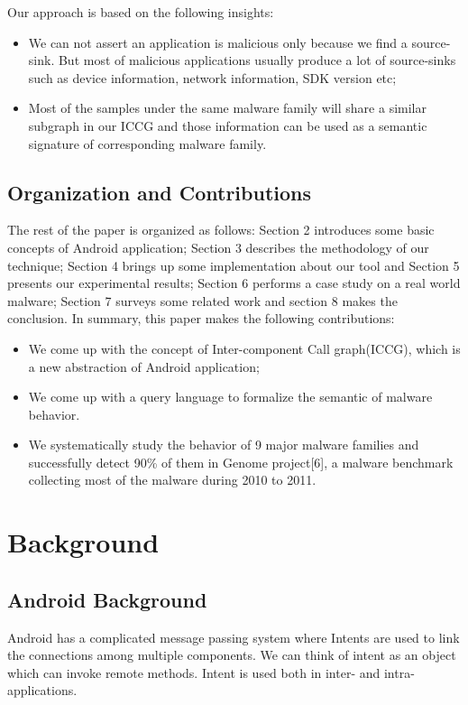 \documentclass{sig-alternate}
\begin{document}
Our approach is based on the following insights:
\begin{itemize}
  \item We can not assert an application is malicious only because we find a source-sink. But most of malicious applications usually produce a lot of source-sinks such as device information, network information, SDK version etc;
    \item Most of the samples under the same malware family will share a similar subgraph in our ICCG and those information can be used as a semantic signature of corresponding malware family.
\end{itemize}

\subsection{Organization and Contributions}
The rest of the paper is organized as follows: Section 2 introduces some basic concepts of Android application; Section 3 describes the methodology of our technique; Section 4 brings up some implementation about our tool and Section 5 presents our experimental results; Section 6 performs a case study on a real world malware; Section 7 surveys some related work and section 8 makes the conclusion. In summary, this paper makes the following contributions:
\begin{itemize}
  \item We come up with the concept of Inter-component Call graph(ICCG), which is a new abstraction of Android application; 
    \item We come up with a query language to formalize the semantic of malware behavior.
  \item  We systematically study the behavior of 9 major malware families and successfully detect 90\% of them in Genome project[6], a malware benchmark collecting most of the malware during 2010 to 2011.
\end{itemize}

\section{Background}

\subsection{Android Background}
Android has a complicated message passing system where Intents are used to link the connections among multiple components.  We can think of intent as an object which can invoke remote methods. Intent is used both in inter- and intra-applications.
\end{document}
